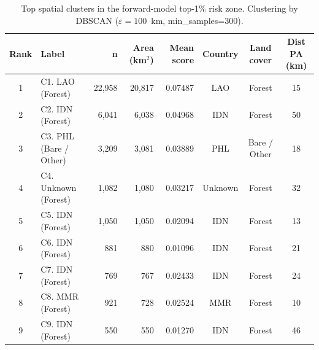 \begin{table}[htbp]
  \centering
  \small
  \caption{Top spatial clusters in the forward-model top-1\% risk zone.
   Clustering by DBSCAN ($\varepsilon=100$~km, min\_samples=300).}
  \label{tab:spatial_clusters}
  \begin{tabular}{clrrrccc}
    \toprule
    Rank & Label & n & Area (km$^2$) & Mean score & Country & Land cover & Dist PA (km) \\
    \midrule
    1 & C1. LAO (Forest) & 22,958 & 20,817 & 0.07487 & LAO & Forest & 15 \\
    2 & C2. IDN (Forest) & 6,041 & 6,038 & 0.04968 & IDN & Forest & 50 \\
    3 & C3. PHL (Bare / Other) & 3,209 & 3,081 & 0.03889 & PHL & Bare / Other & 18 \\
    4 & C4. Unknown (Forest) & 1,082 & 1,080 & 0.03217 & Unknown & Forest & 32 \\
    5 & C5. IDN (Forest) & 1,050 & 1,050 & 0.02094 & IDN & Forest & 13 \\
    6 & C6. IDN (Forest) & 881 & 880 & 0.01096 & IDN & Forest & 21 \\
    7 & C7. IDN (Forest) & 769 & 767 & 0.02433 & IDN & Forest & 24 \\
    8 & C8. MMR (Forest) & 921 & 728 & 0.02524 & MMR & Forest & 10 \\
    9 & C9. IDN (Forest) & 550 & 550 & 0.01270 & IDN & Forest & 46 \\
    \bottomrule
  \end{tabular}
\end{table}
